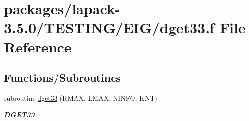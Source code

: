 \hypertarget{dget33_8f}{}\section{packages/lapack-\/3.5.0/\+T\+E\+S\+T\+I\+N\+G/\+E\+I\+G/dget33.f File Reference}
\label{dget33_8f}
\subsection*{Functions/\+Subroutines}
\begin{DoxyCompactItemize}
\item 
subroutine \hyperlink{group__double__eig_ga0d06279a44e3ee4af0c0122fc704857a}{dget33} (R\+M\+A\+X, L\+M\+A\+X, N\+I\+N\+F\+O, K\+N\+T)
\begin{DoxyCompactList}\small\item\em {\bfseries D\+G\+E\+T33} \end{DoxyCompactList}\end{DoxyCompactItemize}
